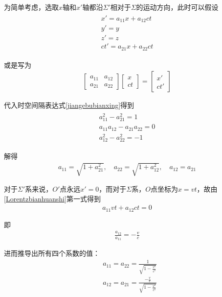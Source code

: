 \documentclass[main.tex]{subfiles}
\begin{document}
为简单考虑，选取$x$轴和$x'$轴都沿$\Sigma '$相对于$\Sigma $的运动方向，此时可以假设
\begin{align}
    \label{Lorentzbianhuanshi}\begin{array}{c}
    x' = a_{11}x+a_{12}ct\\
    y' = y\\
    z' = z\\
    ct' = a_{21}x + a_{22}ct
    \end{array}
\end{align}

或是写为
\begin{align}
    \begin{bmatrix}
      a_{11}&a_{12} \\
      a_{21}&a_{22}
    \end{bmatrix}  
    \begin{bmatrix}
     x\\
    ct
    \end{bmatrix} = 
    \begin{bmatrix}
     x'\\
    ct'
    \end{bmatrix}
\end{align}

代入时空间隔表达式\ref{jiangebubianxing}得到
\begin{align}
    \begin{array}{c}
        a_{11}^2 - a_{21}^2 = 1\\
        a_{11}a_{12} - a_{21}a_{22} = 0\\
        a_{12}^2 - a_{22}^2 = -1
    \end{array}
\end{align}

解得
\begin{align}
    a_{11} = \sqrt{1+a_{21}^2},\quad a_{22} = \sqrt{1+ a_{12}^2},\quad a_{12} = a_{21}
\end{align}

对于$\Sigma '$系来说，$O'$点永远$x' = 0$，而对于$\Sigma $系，$O$点坐标为$x = vt$，故由\ref{Lorentzbianhuanshi}第一式得到
\begin{align}
    a_{11}vt + a_{12}ct = 0
\end{align}

即
\begin{align}
    \frac{a_{12}}{a_{11}} = -\frac{v}{c}
\end{align}

进而推导出所有四个系数的值：
\begin{align}
    &a_{11} = a_{22} = \frac{1}{\displaystyle \sqrt{1-\frac{v^2}{c^2}}}\\
    &a_{12} = a_{21} = \frac{\displaystyle -\frac{v}{c}}{\displaystyle \sqrt{1-\frac{v^2}{c^2}}}
\end{align}
\end{document}
